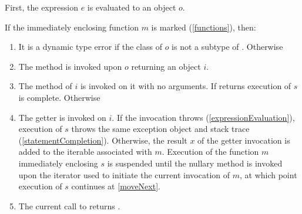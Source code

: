 \documentclass[makeidx]{article}
\begin{document}
{\LMHash{}%
First, the expression $e$ is evaluated to an object $o$.

\LMHash{}%
If the immediately enclosing function $m$ is marked \code{\SYNC*}
(\ref{functions}),
then:
\begin{enumerate}
\item
  It is a dynamic type error
  if the class of $o$ is not a subtype of .
  Otherwise
\item
  The method  is invoked upon $o$ returning an object $i$.
\item
  \label{moveNext} The  method of $i$ is invoked on it
  with no arguments.
  If  returns \FALSE{} execution of $s$ is complete.
  Otherwise
\item
  The getter  is invoked on $i$.
  If the invocation throws
  (\ref{expressionEvaluation}),
  execution of $s$ throws the same exception object and stack trace
  (\ref{statementCompletion}).
  Otherwise, the result $x$ of the getter invocation is added to
  the iterable associated with $m$.
  Execution of the function $m$ immediately enclosing $s$ is suspended
  until the nullary method  is invoked
  upon the iterator used to initiate the current invocation of $m$,
  at which point execution of $s$ continues at \ref{moveNext}.
\item
The current call to  returns \TRUE.
\end{enumerate}

}
\end{document}

